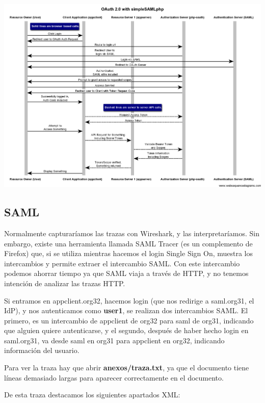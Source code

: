 \documentclass[]{article}
\begin{document}
\begin{center}
\includegraphics[width=0.9\linewidth]{images/sequence-diagram-standard}
\end{center}


\subsection{SAML}

Normalmente capturaríamos las trazas con Wireshark, y las interpretaríamos. Sin embargo, existe una herramienta llamada SAML Tracer (es un complemento de Firefox) que, si se utiliza mientras hacemos el login Single Sign On, muestra los intercambios y permite extraer el intercambio SAML. Con este intercambio podemos ahorrar tiempo ya que SAML viaja a través de HTTP, y no tenemos intención de analizar las trazas HTTP.

Si entramos en appclient.org32, hacemos login (que nos redirige a saml.org31, el IdP), y nos autenticamos como \textbf{user1}, se realizan dos intercambios SAML. El primero, es un intercambio de appclient de org32 para saml de org31, indicando que alguien quiere autenticarse, y el segundo, después de haber hecho login en saml.org31, va desde saml en org31 para appclient en org32, indicando información del usuario.

Para ver la traza hay que abrir \noindent \textbf{anexos/traza.txt}, ya que el documento tiene líneas demasiado largas para aparecer correctamente en el documento. 

De esta traza destacamos los siguientes apartados XML:
\end{document}
